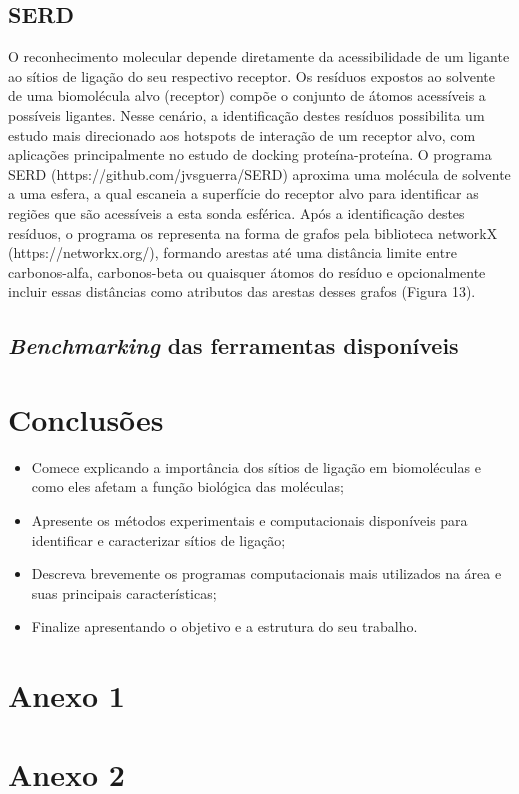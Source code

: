 \documentclass[Portugues]{phdquali}
\begin{document}
\section{SERD}

O reconhecimento molecular depende diretamente da acessibilidade de um ligante ao sítios de ligação do seu respectivo receptor. Os resíduos expostos ao solvente de uma biomolécula alvo (receptor) compõe o conjunto de átomos acessíveis a possíveis ligantes. Nesse cenário, a identificação destes resíduos possibilita um estudo mais direcionado aos hotspots de interação de um receptor alvo, com aplicações principalmente no estudo de docking proteína-proteína. O programa SERD (https://github.com/jvsguerra/SERD) aproxima uma molécula de solvente a uma esfera, a qual escaneia a superfície do receptor alvo para identificar as regiões que são acessíveis a esta sonda esférica. Após a identificação destes resíduos, o programa os representa na forma de grafos pela biblioteca networkX (https://networkx.org/), formando arestas até uma distância limite entre carbonos-alfa, carbonos-beta ou quaisquer átomos do resíduo e opcionalmente incluir essas distâncias como atributos das arestas desses grafos (Figura 13). 

\section{\textit{Benchmarking} das ferramentas disponíveis}


\chapter{Conclusões}

\begin{itemize}
  \item Comece explicando a importância dos sítios de ligação em biomoléculas e como eles afetam a função biológica das moléculas;
  \item Apresente os métodos experimentais e computacionais disponíveis para identificar e caracterizar sítios de ligação;
  \item Descreva brevemente os programas computacionais mais utilizados na área e suas principais características;
  \item Finalize apresentando o objetivo e a estrutura do seu trabalho.
 \end{itemize}





\appendix
\chapter{Anexo 1}
\chapter{Anexo 2}
\end{document}
